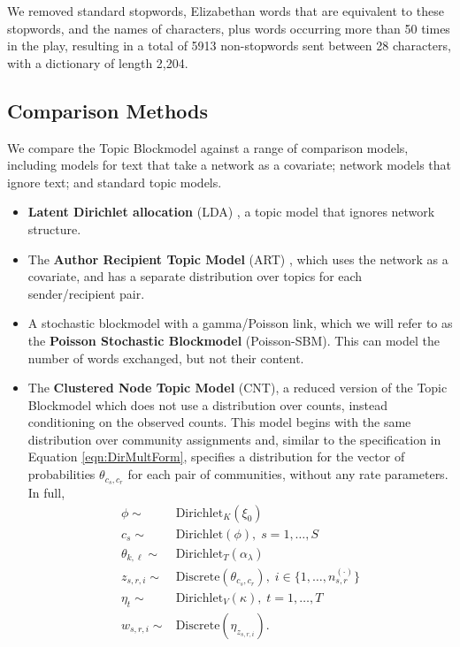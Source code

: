             We removed standard stopwords, Elizabethan words that are equivalent to these stopwords, and the names of characters, plus words occurring more than 50 times in the play, resulting in a total of 5913 non-stopwords sent between 28 characters, with a dictionary of length 2,204. 
        
    \subsection{Comparison Methods}\label{sec:comparisons}
    
        We compare the Topic Blockmodel against a range of comparison models, including models for text that take a network as a covariate; network models that ignore text; and standard topic models. 

        \begin{itemize}
            \item \textbf{Latent Dirichlet allocation} (LDA) \citep{blei2003LDA}, a topic model that ignores network structure.
            \item The \textbf{Author Recipient Topic Model} (ART) \citep{mccallum2005}, which uses the network as a covariate, and has a separate distribution over topics for each sender/recipient pair. 
            \item A stochastic blockmodel with a gamma/Poisson link, which we will refer to as the \textbf{Poisson Stochastic Blockmodel} (Poisson-SBM). This can model the number of words exchanged, but not their content.
            \item The \textbf{Clustered Node Topic Model} (CNT), a reduced version of the Topic Blockmodel which does not use a distribution over counts, instead conditioning on the observed counts.  This model begins with the same distribution over community assignments and, similar to the specification in Equation \ref{eqn:DirMultForm}, specifies a distribution for the vector of probabilities $\theta_{c_s,c_r}$ for each pair of communities, without any rate parameters.  In full,
            \begin{equation}
              \begin{aligned}
                \phi \sim& \mbox{Dirichlet}_K(\xi_0)\\
                c_s \sim& \mbox{Dirichlet}(\phi),\; s=1,\dots,S\\
                \theta_{k,\ell} \sim& \mbox{Dirichlet}_T(\alpha_\lambda)\\
                z_{s,r,i} \sim& \mbox{Discrete}(\theta_{c_s,c_r}),\; i\in\{1,\dots, n_{s,r}^{(\cdot)}\}\\
                \eta_t \sim& \mbox{Dirichlet}_V(\kappa),\; t=1,\dots,T\\
                w_{s,r,i} \sim& \mbox{Discrete}(\eta_{z_{s,r,i}}).
              \end{aligned}\label{eqn:CNTModel}
            \end{equation}
        \end{itemize}
        
